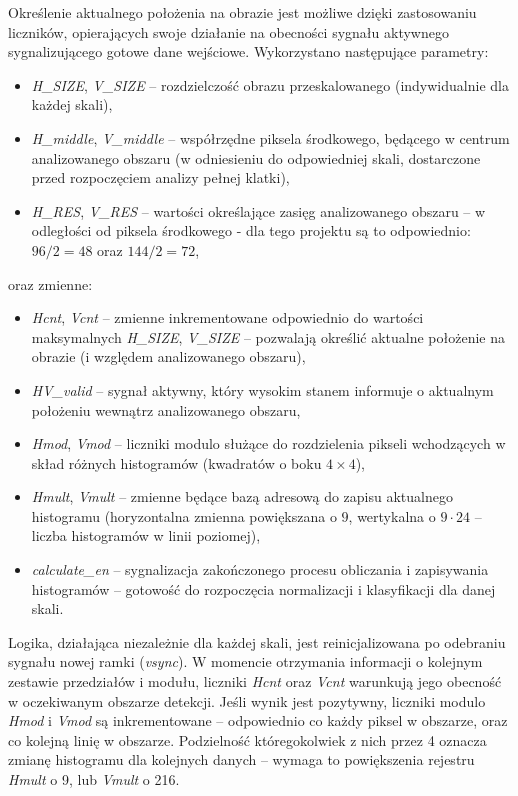 Określenie aktualnego położenia na obrazie jest możliwe dzięki zastosowaniu liczników, opierających swoje działanie na obecności sygnału aktywnego sygnalizującego gotowe dane wejściowe.
Wykorzystano następujące parametry:
\begin{itemize}
	\item \textit{H\_SIZE}, \textit{V\_SIZE} -- rozdzielczość obrazu przeskalowanego (indywidualnie dla każdej skali),
	\item \textit{H\_middle}, \textit{V\_middle} -- współrzędne piksela środkowego, będącego w centrum analizowanego obszaru (w odniesieniu do odpowiedniej skali, dostarczone przed rozpoczęciem analizy pełnej klatki),
	\item \textit{H\_RES}, \textit{V\_RES} -- wartości określające zasięg analizowanego obszaru -- w odległości od piksela środkowego - dla tego projektu są to odpowiednio: $96/2=48$ oraz $144/2=72$,
\end{itemize}
oraz zmienne:
\begin{itemize}
	\item \textit{Hcnt}, \textit{Vcnt} -- zmienne inkrementowane odpowiednio do wartości maksymalnych \textit{H\_SIZE}, \textit{V\_SIZE} -- pozwalają określić aktualne położenie na obrazie (i względem analizowanego obszaru),
	\item \textit{HV\_valid} -- sygnał aktywny, który wysokim stanem informuje o aktualnym położeniu wewnątrz analizowanego obszaru,
	\item \textit{Hmod}, \textit{Vmod} -- liczniki modulo służące do rozdzielenia pikseli wchodzących w skład różnych histogramów (kwadratów o boku $4\times 4$),
	\item \textit{Hmult}, \textit{Vmult} -- zmienne będące bazą adresową do zapisu aktualnego histogramu (horyzontalna zmienna powiększana o $9$, wertykalna o $9\cdot24$ -- liczba histogramów w linii poziomej),
	\item \textit{calculate\_en} -- sygnalizacja zakończonego procesu obliczania i zapisywania histogramów -- gotowość do rozpoczęcia normalizacji i klasyfikacji dla danej skali. %
\end{itemize}
Logika, działająca niezależnie dla każdej skali, jest reinicjalizowana po odebraniu sygnału nowej ramki (\textit{vsync}). W momencie otrzymania informacji o kolejnym zestawie przedziałów i modułu, liczniki \textit{Hcnt} oraz \textit{Vcnt} warunkują jego obecność w oczekiwanym obszarze detekcji. Jeśli wynik jest pozytywny, liczniki modulo \textit{Hmod} i \textit{Vmod} są inkrementowane -- odpowiednio co każdy piksel w obszarze, oraz co kolejną linię w obszarze. Podzielność któregokolwiek z nich przez 4 oznacza zmianę histogramu dla kolejnych danych -- wymaga to powiększenia rejestru \textit{Hmult} o 9, lub \textit{Vmult} o 216. 
